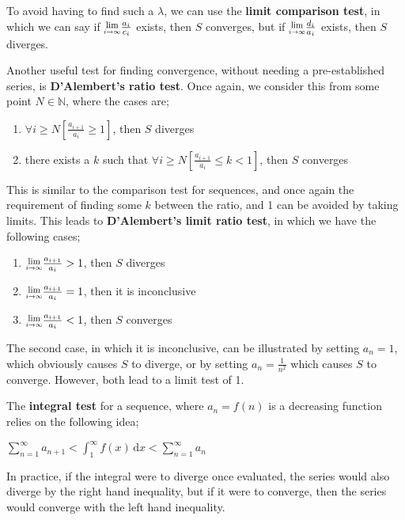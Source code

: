 \documentclass[a4paper, 12pt]{article}
\newcommand{\defint}[4]{\int_{#1}^{#2} #3 \, \mathrm{d}#4}
\newcommand{\limit}[2]{\raisebox{0.5ex}{\scalebox{0.8}{$\displaystyle{\lim_{#1 \to #2}}$}}}
\newcommand{\summation}[3]{\sum\limits_{#1}^{#2} #3}
\begin{document}
                To avoid having to find such a $\lambda$, we can use the \textbf{limit comparison test}, in which we can say if $\limit{i}{\infty}\frac{a_i}{c_i}$ exists, then $S$ converges, but if $\limit{i}{\infty}\frac{d_i}{a_i}$ exists, then $S$ diverges.
                \medskip

                Another useful test for finding convergence, without needing a pre-established series, is \textbf{D'Alembert's ratio test}. Once again, we consider this from some point $N \in \mathbb{N}$, where the cases are;
                \begin{enumerate}[1.]
                    \itemsep0em
                    \item $\forall i \geq N [\frac{a_{i + 1}}{a_i} \geq 1]$, then $S$ diverges
                    \item there exists a $k$ such that $\forall i \geq N [\frac{a_{i + 1}}{a_i} \leq k < 1]$, then $S$ converges
                \end{enumerate}
                This is similar to the comparison test for sequences, and once again the requirement of finding some $k$ between the ratio, and 1 can be avoided by taking limits. This leads to \textbf{D'Alembert's limit ratio test}, in which we have the following cases;
                \begin{enumerate}[1.]
                    \itemsep0em
                    \item $\limit{i}{\infty}\frac{a_{i + 1}}{a_i} > 1$, then $S$ diverges
                    \item $\limit{i}{\infty}\frac{a_{i + 1}}{a_i} = 1$, then it is inconclusive
                    \item $\limit{i}{\infty}\frac{a_{i + 1}}{a_i} < 1$, then $S$ converges
                \end{enumerate}
                The second case, in which it is inconclusive, can be illustrated by setting $a_n = 1$, which obviously causes $S$ to diverge, or by setting $a_n = \frac{1}{n^2}$ which causes $S$ to converge. However, both lead to a limit test of 1.
                \medskip

                The \textbf{integral test} for a sequence, where $a_n = f(n)$ is a decreasing function relies on the following idea;
                \begin{center}
                    $\summation{n = 1}{\infty}{a_{n + 1}} < \defint{1}{\infty}{f(x)}{x} < \summation{n = 1}{\infty}{a_n}$
                \end{center}
                In practice, if the integral were to diverge once evaluated, the series would also diverge by the right hand inequality, but if it were to converge, then the series would converge with the left hand inequality.
\end{document}
